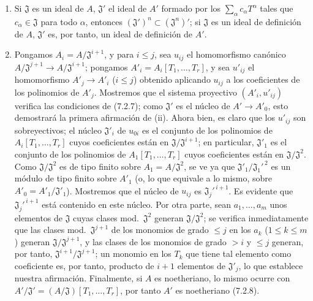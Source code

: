\begin{enumerate}
  \item[(i)] Si $\mathfrak J$ es un ideal de $A$, $\mathfrak J'$ el ideal de
  $A'$ formado por los $\sum_\alpha c_\alpha T^\alpha$ tales que
  $c_\alpha\in\mathfrak J$ para todo $\alpha$, entonces
  $(\mathfrak J')^n\subset(\mathfrak J^n)'$; si $\mathfrak J$ es un ideal de
  definición de $A$, $\mathfrak J'$ es, por tanto, un ideal de definición de $A'$.

  \item[(ii)] Pongamos $A_i=A/\mathfrak J^{i+1}$, y para $i\leq j$, sea
  $u_{ij}$ el homomorfismo canónico
  $A/\mathfrak J^{j+1}\to A/\mathfrak J^{i+1}$; pongamos
  $A'_i=A_i[T_1,\ldots,T_r]$, y sea $u'_{ij}$ el homomorfismo
  $A'_j\to A'_i$ ($i\leq j$) obtenido aplicando $u_{ij}$ a los coeficientes
  de los polinomios de $A'_j$. Mostremos que el sistema proyectivo
  $(A'_i,u'_{ij})$ verifica las condiciones de (7.2.7); como $\mathfrak J'$ es
  el núcleo de $A'\to A'_0$, esto demostrará la primera afirmación de (ii). Ahora bien,
  es claro que los $u'_{ij}$ son sobreyectivos; el núcleo $\mathfrak J'_i$
  de $u_{0i}$ es el conjunto de los polinomios de
  $A_i[T_1,\ldots,T_r]$ cuyos coeficientes están en
  $\mathfrak J/\mathfrak J^{i+1}$; en particular, $\mathfrak J'_1$ es
  el conjunto de los polinomios de $A_1[T_1,\ldots,T_r]$ cuyos coeficientes
  están en $\mathfrak J/\mathfrak J^2$. Como $\mathfrak J/\mathfrak J^2$
  es de tipo finito sobre $A_1=A/\mathfrak J^2$, se ve ya que
  $\mathfrak J'_1/\mathfrak J_1'^{\,2}$ es un módulo de tipo finito sobre $A'_1$
  (o, lo que equivale a lo mismo, sobre
  $A'_0=A'_1/\mathfrak J'_1$). Mostremos que el núcleo de $u_{ij}$ es
  $\mathfrak J_j'^{\,i+1}$. Es evidente que
  $\mathfrak J_j'^{\,i+1}$ está contenido en este núcleo. Por otra parte, sean
  $a_1,\ldots,a_m$ unos elementos de $\mathfrak J$ cuyas clases
  mod.~$\mathfrak J^2$ generan $\mathfrak J/\mathfrak J^2$; se verifica
  inmediatamente que las clases mod.~$\mathfrak J^{j+1}$ de los monomios de grado
  $\leq j$ en los $a_k$ ($1\leq k\leq m$) generan
  $\mathfrak J/\mathfrak J^{j+1}$, y las clases de los monomios de grado $>i$
  y $\leq j$ generan, por tanto,
  $\mathfrak J^{i+1}/\mathfrak J^{j+1}$; un monomio en los $T_k$ que tiene tal
  elemento como coeficiente es, por tanto, producto de $i+1$ elementos de
  $\mathfrak J'_j$, lo que establece nuestra afirmación. Finalmente, si $A$ es
  noetheriano, lo mismo ocurre con
  $A'/\mathfrak J'=(A/\mathfrak J)[T_1,\ldots,T_r]$, por tanto $A'$ es noetheriano
  (7.2.8).
\end{enumerate}

